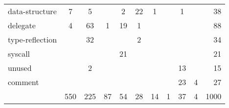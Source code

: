 \begin{table}[h]
\begin{tabularx}{\textwidth}{Xccccccccc|r}
                           data-structure &    7 &    5 &     &    2 &  22 &   1 &     &   1 &     &    38 \\
        \rowcolor{verylightgray}
                                 delegate &    4 &   63 &   1 &   19 &   1 &     &     &     &     &    88 \\
                          type-reflection &      &   32 &     &      &   2 &     &     &     &     &    34 \\
        \rowcolor{verylightgray}
                                  syscall &      &      &     &   21 &     &     &     &     &     &    21 \\
                                   unused &      &    2 &     &      &     &     &     &  13 &     &    15 \\
        \rowcolor{verylightgray}
                                  comment &      &      &     &      &     &     &     &  23 &   4 &    27 \\ \hline
                                       {} &  550 &  225 &  87 &   54 &  28 &  14 &   1 &  37 &   4 &  1000 \\
        \bottomrule
    \end{tabularx}
\end{table}

